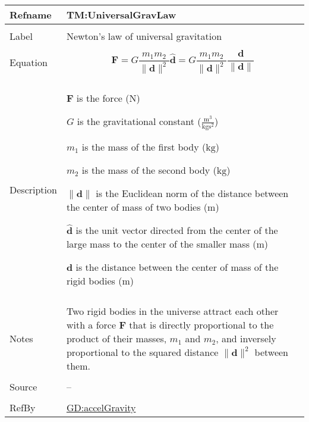 \documentclass[12pt]{article}
\begin{document}
\begin{minipage}{\textwidth}
\begin{tabular}{>{\raggedright}p{}>{\raggedright\arraybackslash}p{}}
\toprule \textbf{Refname} & \textbf{TM:UniversalGravLaw}
\label{TM:UniversalGravLaw}
\\ \midrule \\
Label & Newton's law of universal gravitation
        
\\ \midrule \\
Equation & \begin{displaymath}
           \symbf{F}=G \frac{{m_{1}} {m_{2}}}{\|\symbf{d}\|^{2}} \symbf{\hat{d}}=G \frac{{m_{1}} {m_{2}}}{\|\symbf{d}\|^{2}} \frac{\symbf{d}}{\|\symbf{d}\|}
           \end{displaymath}
\\ \midrule \\
Description & \begin{symbDescription}
              \item{$\symbf{F}$ is the force (${\text{N}}$)}
              \item{$G$ is the gravitational constant ($\frac{\text{m}^{3}}{\text{kg}\text{s}^{2}}$)}
              \item{${m_{1}}$ is the mass of the first body (${\text{kg}}$)}
              \item{${m_{2}}$ is the mass of the second body (${\text{kg}}$)}
              \item{$\|\symbf{d}\|$ is the Euclidean norm of the distance between the center of mass of two bodies (${\text{m}}$)}
              \item{$\symbf{\hat{d}}$ is the unit vector directed from the center of the large mass to the center of the smaller mass (${\text{m}}$)}
              \item{$\symbf{d}$ is the distance between the center of mass of the rigid bodies (${\text{m}}$)}
              \end{symbDescription}
\\ \midrule \\
Notes & Two rigid bodies in the universe attract each other with a force $\symbf{F}$ that is directly proportional to the product of their masses, ${m_{1}}$ and ${m_{2}}$, and inversely proportional to the squared distance ${\|\symbf{d}\|^{2}}$ between them.
        
\\ \midrule \\
Source & --
         
\\ \midrule \\
RefBy & \hyperref[GD:accelGravity]{GD:accelGravity}
        
\\ \bottomrule
\end{tabular}
\end{minipage}
\end{document}
